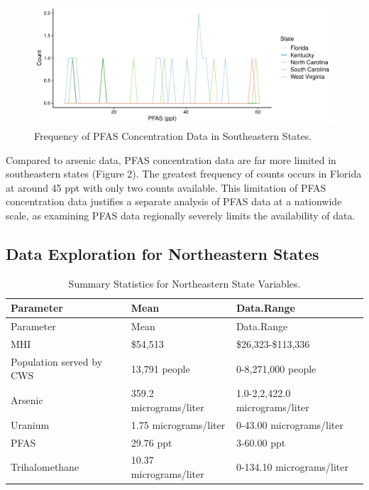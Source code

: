 \documentclass[12pt,]{article}
\begin{document}
\begin{figure}
\centering
\includegraphics{Project_Template_files/figure-latex/figs2-1.pdf}
\caption{Frequency of PFAS Concentration Data in Southeastern States.}
\end{figure}

Compared to arsenic data, PFAS concentration data are far more limited
in southeastern states (Figure 2). The greatest frequency of counts
occurs in Florida at around 45 ppt with only two counts available. This
limitation of PFAS concentration data justifies a separate analysis of
PFAS data at a nationwide scale, as examining PFAS data regionally
severely limits the availability of data.

\newpage

\hypertarget{data-exploration-for-northeastern-states}{%
\subsection{Data Exploration for Northeastern
States}\label{data-exploration-for-northeastern-states}}

\begin{longtable}[]{@{}lll@{}}
\caption{Summary Statistics for Northeastern State
Variables.}\tabularnewline
\toprule
Parameter & Mean & Data.Range\tabularnewline
\midrule
\endfirsthead
\toprule
Parameter & Mean & Data.Range\tabularnewline
\midrule
\endhead
MHI & \$54,513 & \$26,323-\$113,336\tabularnewline
Population served by CWS & 13,791 people & 0-8,271,000
people\tabularnewline
Arsenic & 359.2 micrograms/liter & 1.0-2,2,422.0
micrograms/liter\tabularnewline
Uranium & 1.75 micrograms/liter & 0-43.00
micrograms/liter\tabularnewline
PFAS & 29.76 ppt & 3-60.00 ppt\tabularnewline
Trihalomethane & 10.37 micrograms/liter & 0-134.10
micrograms/liter\tabularnewline
\bottomrule
\end{longtable}

\begin{quote}
\end{quote}
\end{document}
